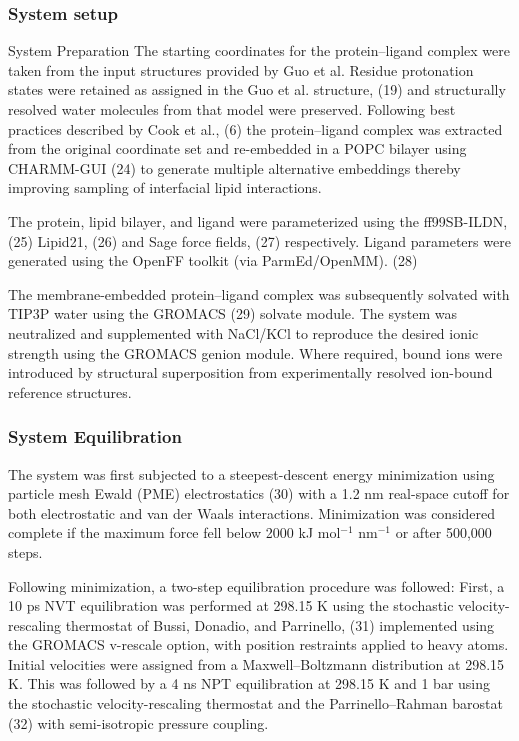 \subsubsection{System setup}
System Preparation
The starting coordinates for the protein--ligand complex were taken from the input structures provided by Guo et al. Residue protonation states were retained as assigned in the Guo et al. structure, (19) and structurally resolved water molecules from that model were preserved. Following best practices described by Cook et al., (6) the protein--ligand complex was extracted from the original coordinate set and re-embedded in a POPC bilayer using CHARMM-GUI (24) to generate multiple alternative embeddings thereby improving sampling of interfacial lipid interactions.

The protein, lipid bilayer, and ligand were parameterized using the ff99SB-ILDN, (25) Lipid21, (26) and Sage force fields, (27) respectively. Ligand parameters were generated using the OpenFF toolkit (via ParmEd/OpenMM). (28)

The membrane-embedded protein--ligand complex was subsequently solvated with TIP3P water using the GROMACS (29) solvate module. The system was neutralized and supplemented with NaCl/KCl to reproduce the desired ionic strength using the GROMACS genion module. Where required, bound ions were introduced by structural superposition from experimentally resolved ion-bound reference structures.

\subsubsection{System Equilibration}

The system was first subjected to a steepest-descent energy minimization using particle mesh Ewald (PME) electrostatics (30) with a 1.2 nm real-space cutoff for both electrostatic and van der Waals interactions. Minimization was considered complete if the maximum force fell below 2000 kJ mol$^{-1}$ nm$^{-1}$ or after 500,000 steps.

Following minimization, a two-step equilibration procedure was followed: First, a 10 ps NVT equilibration was performed at 298.15 K using the stochastic velocity-rescaling thermostat of Bussi, Donadio, and Parrinello, (31) implemented using the GROMACS v-rescale option, with position restraints applied to heavy atoms. Initial velocities were assigned from a Maxwell--Boltzmann distribution at 298.15 K. This was followed by a 4 ns NPT equilibration at 298.15 K and 1 bar using the stochastic velocity-rescaling thermostat and the Parrinello--Rahman barostat (32) with semi-isotropic pressure coupling.

